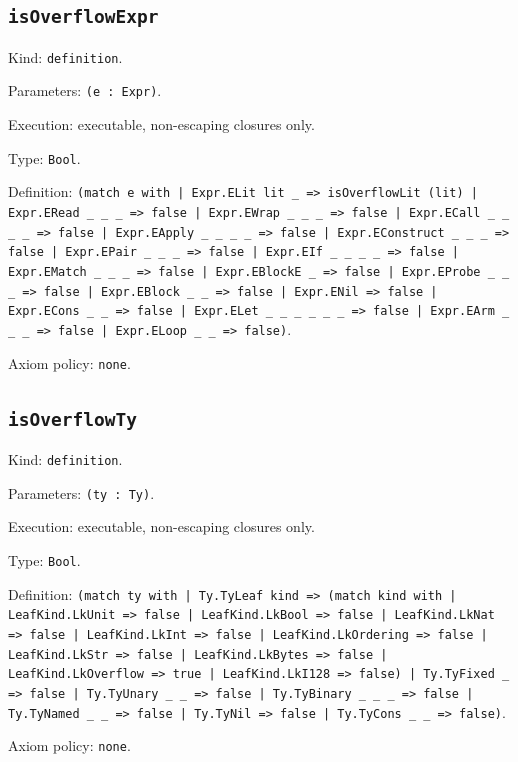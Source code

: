 \documentclass[11pt]{article}
\begin{document}
\subsection*{\texttt{isOverflowExpr}}
\noindent Kind: \texttt{definition}.\par
\noindent Parameters: \texttt{(e : Expr)}.\par
\noindent Execution: executable, non-escaping closures only.\par
\noindent Type: \texttt{Bool}.\par
\noindent Definition: \texttt{(match e with | Expr.ELit lit \_ => isOverflowLit (lit) | Expr.ERead \_ \_ \_ => false | Expr.EWrap \_ \_ \_ => false | Expr.ECall \_ \_ \_ \_ => false | Expr.EApply \_ \_ \_ \_ => false | Expr.EConstruct \_ \_ \_ => false | Expr.EPair \_ \_ \_ => false | Expr.EIf \_ \_ \_ \_ => false | Expr.EMatch \_ \_ \_ => false | Expr.EBlockE \_ => false | Expr.EProbe \_ \_ \_ => false | Expr.EBlock \_ \_ => false | Expr.ENil => false | Expr.ECons \_ \_ => false | Expr.ELet \_ \_ \_ \_ \_ \_ => false | Expr.EArm \_ \_ \_ => false | Expr.ELoop \_ \_ => false)}.\par
\noindent Axiom policy: \texttt{none}.\par
\subsection*{\texttt{isOverflowTy}}
\noindent Kind: \texttt{definition}.\par
\noindent Parameters: \texttt{(ty : Ty)}.\par
\noindent Execution: executable, non-escaping closures only.\par
\noindent Type: \texttt{Bool}.\par
\noindent Definition: \texttt{(match ty with | Ty.TyLeaf kind => (match kind with | LeafKind.LkUnit => false | LeafKind.LkBool => false | LeafKind.LkNat => false | LeafKind.LkInt => false | LeafKind.LkOrdering => false | LeafKind.LkStr => false | LeafKind.LkBytes => false | LeafKind.LkOverflow => true | LeafKind.LkI128 => false) | Ty.TyFixed \_ => false | Ty.TyUnary \_ \_ => false | Ty.TyBinary \_ \_ \_ => false | Ty.TyNamed \_ \_ => false | Ty.TyNil => false | Ty.TyCons \_ \_ => false)}.\par
\noindent Axiom policy: \texttt{none}.\par
\end{document}
